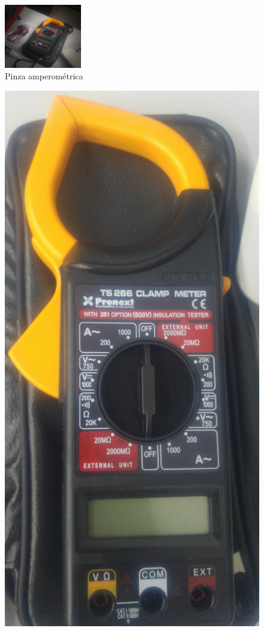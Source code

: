 \begin{figure}[htbp]
  \centering
  \includegraphics[width=0.3\textwidth,height=\textheight,keepaspectratio]{images/fotos/pinza1.jpg}
  \caption{Pinza amperométrica}
  \label{fig:pinza_amperometrica}
\end{figure}

\begin{figure}[htbp]
  \centering
  \includegraphics[width=\textwidth,height=\textheight,keepaspectratio]{images/fotos/pinza2.jpg}

\end{figure}
